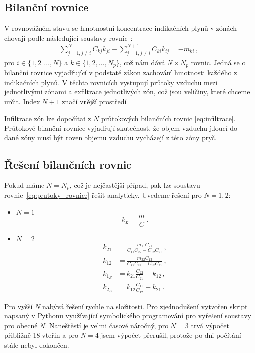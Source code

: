 \subsection{Bilanční rovnice}
V rovnovážném stavu se hmotnostní koncentrace indikačních plynů v zónách chovají podle následující soustavy rovnic~\cite{japonci}:
\begin{align}
    \sum_{j=1,j\neq i}^{N}C_{kj}k_{ji}-\sum_{j=1,j\neq i}^{N+1}C_{ki}k_{ij}=-m_{ki}\,,
    \label{eq:prutoky_rovnice}
\end{align}
pro $i\in\{1,2, \ldots, N\}$ a $k\in\{1,2,\ldots, N_p\}$, což nám dává $N\times N_p$ rovnic. Jedná se o bilanční rovnice vyjadřující v podstatě zákon zachování hmotnosti každého z indikačních plynů. V těchto rovnicích vystupují průtoky vzduchu mezi jednotlivými zónami a exfiltrace jednotlivých zón, což jsou veličiny, které chceme určit. Index $N+1$ značí vnější prostředí.

Infiltrace zón lze dopočítat z $N$ průtokových bilančních rovnic \eqref{eq:infiltrace}. Průtokové bilanční rovnice vyjadřují skutečnost, že objem vzduchu jdoucí do dané zóny musí být roven objemu vzduchu vycházejí z této zóny pryč. 

\subsection{Řešení bilančních rovnic}
Pokud máme $N=N_p$, což je nejčastější případ, pak lze soustavu rovnic~\eqref{eq:prutoky_rovnice} řešit analyticky. Uvedeme řešení pro $N=1, 2$:
\begin{itemize}
    \item $N=1$
        \begin{equation}
            k_E=\frac{m}{C}\,.
        \end{equation}
    \item $N=2$
        \begin{align}
            k_{21}&=\frac{m_{11}C_{21}}{C_{11}C_{22}-C_{12}C_{21}}\,, \\
            k_{12}&=\frac{m_{22}C_{12}}{C_{11}C_{22}-C_{12}C_{21}}\,, \\
            k_{1_E}&=k_{21}\frac{C_{22}}{C_{21}}-k_{12}\,,\\
            k_{2_E}&=k_{12}\frac{C_{11}}{C_{12}}-k_{21}\,.
        \end{align}
\end{itemize}
Pro vyšší $N$ nabývá řešení rychle na složitosti. Pro zjednodušení vytvořen skript napsaný v Pythonu využívající symbolického programování pro vyřešení soustavy pro obecné $N$. Naneštěstí je velmi časově náročný, pro $N=3$ trvá výpočet přibližně 18 vteřin a pro $N=4$ jsem výpočet přerušil, protože po dni počítání stále nebyl dokončen.

